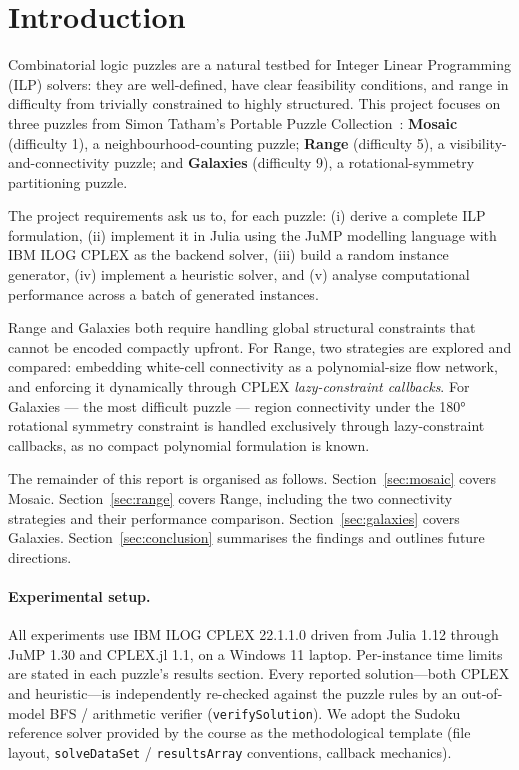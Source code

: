 \section{Introduction}

Combinatorial logic puzzles are a natural testbed for Integer Linear Programming (ILP) solvers: they are well-defined, have clear feasibility conditions, and range in difficulty from trivially constrained to highly structured. This project focuses on three puzzles from Simon Tatham's Portable Puzzle Collection~\cite{tatham}: \textbf{Mosaic} (difficulty 1), a neighbourhood-counting puzzle; \textbf{Range} (difficulty 5), a visibility-and-connectivity puzzle; and \textbf{Galaxies} (difficulty 9), a rotational-symmetry partitioning puzzle.

The project requirements ask us to, for each puzzle: (i) derive a complete ILP formulation, (ii) implement it in Julia using the JuMP modelling language with IBM ILOG CPLEX as the backend solver, (iii) build a random instance generator, (iv) implement a heuristic solver, and (v) analyse computational performance across a batch of generated instances.

Range and Galaxies both require handling global structural constraints that cannot be encoded compactly upfront. For Range, two strategies are explored and compared: embedding white-cell connectivity as a polynomial-size flow network, and enforcing it dynamically through CPLEX \emph{lazy-constraint callbacks}. For Galaxies --- the most difficult puzzle --- region connectivity under the 180° rotational symmetry constraint is handled exclusively through lazy-constraint callbacks, as no compact polynomial formulation is known.

The remainder of this report is organised as follows. Section~\ref{sec:mosaic} covers Mosaic. Section~\ref{sec:range} covers Range, including the two connectivity strategies and their performance comparison. Section~\ref{sec:galaxies} covers Galaxies. Section~\ref{sec:conclusion} summarises the findings and outlines future directions.

\paragraph{Experimental setup.} All experiments use IBM ILOG CPLEX 22.1.1.0 driven from Julia 1.12 through JuMP 1.30 and CPLEX.jl 1.1, on a Windows 11 laptop. Per-instance time limits are stated in each puzzle's results section. Every reported solution---both CPLEX and heuristic---is independently re-checked against the puzzle rules by an out-of-model BFS / arithmetic verifier (\texttt{verifySolution}). We adopt the Sudoku reference solver provided by the course as the methodological template (file layout, \texttt{solveDataSet} / \texttt{resultsArray} conventions, callback mechanics).

